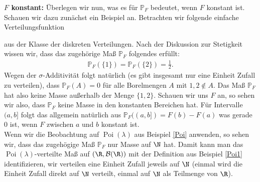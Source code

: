 \begin{disc}
\textbf{$F$ konstant:} \"Uberlegen wir nun, was es f\"ur $\mathbb P_F$ bedeutet, wenn $F$ konstant ist. Schauen wir dazu zun\"achst ein Beispiel an. Betrachten wir folgende einfache Verteilungsfunktion
\begin{center}	
\end{center}
	aus der Klasse der diskreten Verteilungen. Nach der Diskussion zur Stetigkeit wissen wir, dass das zugeh\"orige Ma\ss{} $\mathbb P_F$ folgendes erf\"ullt:
	\begin{align*}
		\mathbb P_F(\{1\})=	\mathbb P_F(\{2\})=\frac{1}{2}.
	\end{align*}
	Wegen der $\sigma$-Additivit\"at folgt nat\"urlich (es gibt insgesamt nur eine Einheit Zufall zu verteilen), dass $\mathbb P_F(A)=0$ f\"ur alle Borelmengen $A$ mit $1,2\notin A$. Das Ma\ss{} $\mathbb P_F$ hat also keine Masse au\ss erhalb der Menge $\{1,2\}$. Schauen wir uns $F$ an, so sehen wir also, dass $\mathbb P_F$ keine Masse in den konstanten Bereichen hat. F\"ur Intervalle $(a,b]$ folgt das allgemein nat\"urlich aus $\mathbb P_F((a,b])=F(b)-F(a)$ was gerade $0$ ist, wenn $F$ zwischen $a$ und $b$ konstant ist.\\
	Wenn wir die Beobachtung auf $\operatorname{Poi}(\lambda)$ aus Beispiel \ref{Poi} anwenden, so sehen wir, dass das zugeh\"ogige Ma\ss{} $\mathbb P_F$ nur Masse auf $\N$ hat. Damit kann man das $\operatorname{Poi}(\lambda)$-verteilte Ma\ss{} auf $(\R, \mathcal B(\R))$ mit der Definition aus Beispiel \ref{Poi1} identifizieren, wir verteilen eine Einheit Zufall jeweils auf $\N$ (einmal wird die Einheit Zufall direkt auf $\N$ verteilt, einmal auf $\N$ als Teilmenge von $\R$).
	

\end{disc}
